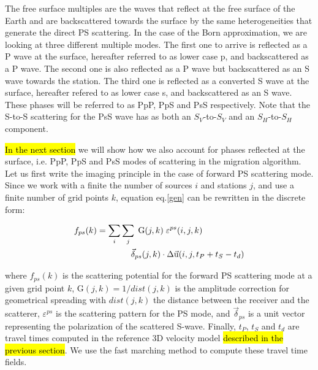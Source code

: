 \documentclass[10pt,a4paper]{article}
\begin{document}
The free surface multiples are the waves that reflect at the free surface of the Earth and are backscattered towards the surface by the same heterogeneities that generate the direct PS scattering.
In the case of the Born approximation, we are looking at three different multiple modes. %
The first one to arrive is reflected as a P wave at the surface, hereafter referred to as lower case p, and backscattered as a P wave.
The second one is also reflected as a P wave but backscattered as an S wave towards the station.
The third one is reflected as a converted S wave at the surface, hereafter refered to as lower case s, and backscattered as an S wave.
These phases will be referred to as PpP, PpS and PsS respectively.
Note that the S-to-S scattering for the PsS wave has as both an $S_V$-to-$S_V$ and an $S_H$-to-$S_H$ component.

\hl{In the next section} we will show how we also account for phases reflected at the surface, i.e. PpP, PpS and PsS modes of scattering in the migration algorithm.
Let us first write the imaging principle in the case of forward PS scattering mode.
Since we work with a finite the number of sources $i$ and stations $j$, and use a finite number of grid points $k$, equation eq.\eqref{gen} can be rewritten in the discrete form:

\begin{align}
  f_{ps}(k) &= \sum_i \sum_j \; \text{G}(j,k) \; \varepsilon^{ps}(i,j,k) \; \notag\\&\qquad\qquad \vec{\delta}_{ps}(j,k) \cdot \Delta\vec{\text{u}}(i,j,t_P+t_S-t_d)
 \label{ps}
\end{align}
\vspace{1mm}

\noindent where $f_{ps}(k)$ is the scattering potential for the forward PS scattering mode at a given grid point $k$,
G$(j,k) = 1 / dist(j,k)$ is the amplitude correction for geometrical spreading with $dist(j,k)$ the distance between the receiver and the scatterer, 
$\varepsilon^{ps}$ is the scattering pattern for the PS mode, 
and $\vec{\delta}_{ps}$ is a unit vector representing the polarization of the scattered S-wave.
Finally, $t_P$, $t_S$ and $t_d$ are travel times computed in the reference 3D velocity model \hl{described in the previous section}. %
We use the fast marching method \citep[FM3D,][]{deko_gji_06} to compute these travel time fields.
\end{document}
